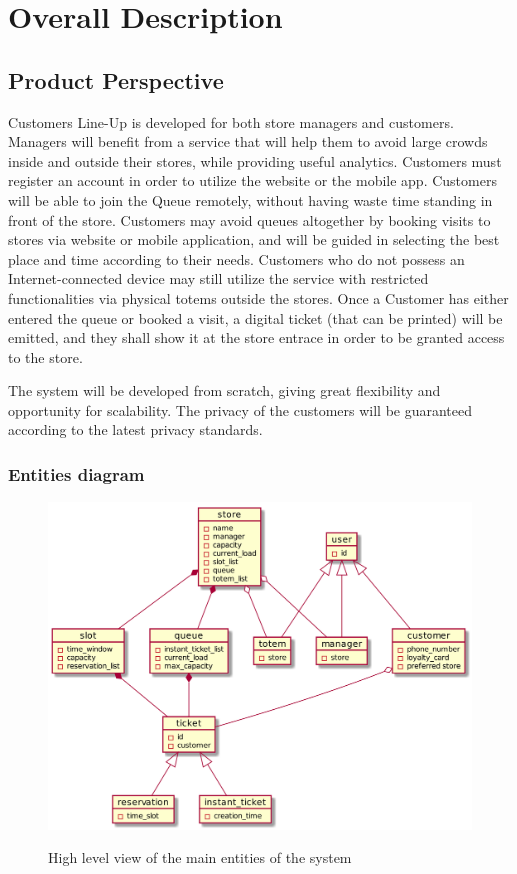 
\section{Overall Description}\label{sec:overall_desc}

\subsection{Product Perspective}

Customers Line-Up is developed for both store managers and customers.
Managers will benefit from a service that will help them to avoid large crowds inside and outside their stores, while providing useful analytics.
Customers must register an account in order to utilize the website or the mobile app.
Customers will be able to join the Queue remotely, without having waste time standing in front of the store.
Customers may avoid queues altogether by booking visits to stores via website or mobile application, and will be guided in selecting the best place and time according to their needs.
Customers who do not possess an Internet-connected device may still utilize the service with restricted functionalities via physical totems outside the stores.
Once a Customer has either entered the queue or booked a visit, a digital ticket (that can be printed) will be emitted, and they shall show it at the store entrace in order to be granted access to the store.

The system will be developed from scratch, giving great flexibility and opportunity for scalability.
The privacy of the customers will be guaranteed according to the latest privacy standards.

\subsubsection{Entities diagram}
\begin{figure}[H]
    \centering
    \includegraphics[width=1\textwidth]{uml/high_level_UML.png}
    \label{fig:high_UML}
    \caption{High level view of the main entities of the system}
\end{figure}


